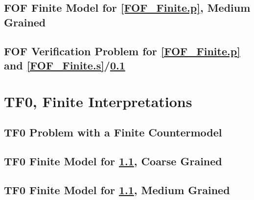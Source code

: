\documentclass{easychair}
\begin{document}
\newpage
\subsection{FOF Finite Model for \ref{FOF_Finite.p}, Medium Grained}
\label{FOF_Finite_Medium.s}
\begin{small}

\end{small}

\newpage
\subsection{FOF Verification Problem for \ref{FOF_Finite.p} and 
            \ref{FOF_Finite.s}/\ref{FOF_Finite_Medium.s}}
\label{FOF_Finite.s.p}
\begin{small}

\end{small}

\newpage
\section{TF0, Finite Interpretations}
\label{TF0Finite}

\subsection{TF0 Problem with a Finite Countermodel}
\label{TFF_Finite.p}
\begin{small}

\end{small}

\newpage
\subsection{TF0 Finite Model for \ref{TFF_Finite.p}, Coarse Grained}
\label{TFF_Finite.s}
\begin{small}

\end{small}

\newpage
\subsection{TF0 Finite Model for \ref{TFF_Finite.p}, Medium Grained}
\label{TFF_Finite_Medium.s}
\begin{small}

\end{small}
\end{document}
